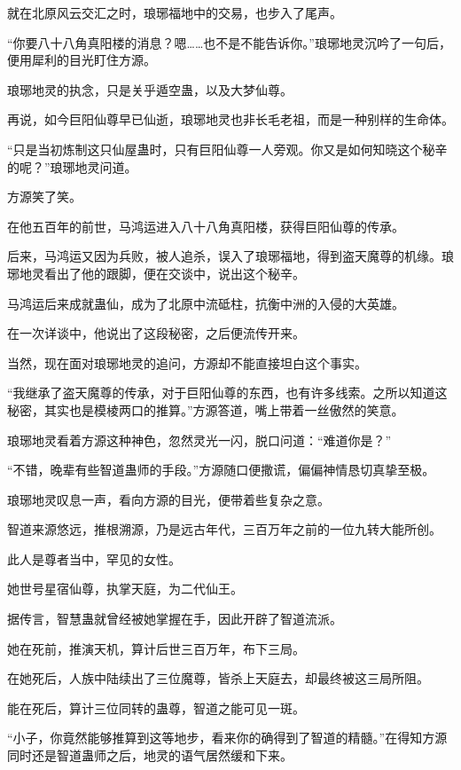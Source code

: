 
\begin{this_body}

就在北原风云交汇之时，琅琊福地中的交易，也步入了尾声。

“你要八十八角真阳楼的消息？嗯……也不是不能告诉你。”琅琊地灵沉吟了一句后，便用犀利的目光盯住方源。

琅琊地灵的执念，只是关乎遁空蛊，以及大梦仙尊。

再说，如今巨阳仙尊早已仙逝，琅琊地灵也非长毛老祖，而是一种别样的生命体。

“只是当初炼制这只仙屋蛊时，只有巨阳仙尊一人旁观。你又是如何知晓这个秘辛的呢？”琅琊地灵问道。

方源笑了笑。

在他五百年的前世，马鸿运进入八十八角真阳楼，获得巨阳仙尊的传承。

后来，马鸿运又因为兵败，被人追杀，误入了琅琊福地，得到盗天魔尊的机缘。琅琊地灵看出了他的跟脚，便在交谈中，说出这个秘辛。

马鸿运后来成就蛊仙，成为了北原中流砥柱，抗衡中洲的入侵的大英雄。

在一次详谈中，他说出了这段秘密，之后便流传开来。

当然，现在面对琅琊地灵的追问，方源却不能直接坦白这个事实。

“我继承了盗天魔尊的传承，对于巨阳仙尊的东西，也有许多线索。之所以知道这秘密，其实也是模棱两口的推算。”方源答道，嘴上带着一丝傲然的笑意。

琅琊地灵看着方源这种神色，忽然灵光一闪，脱口问道：“难道你是？”

“不错，晚辈有些智道蛊师的手段。”方源随口便撒谎，偏偏神情恳切真挚至极。

琅琊地灵叹息一声，看向方源的目光，便带着些复杂之意。

智道来源悠远，推根溯源，乃是远古年代，三百万年之前的一位九转大能所创。

此人是尊者当中，罕见的女性。

她世号星宿仙尊，执掌天庭，为二代仙王。

据传言，智慧蛊就曾经被她掌握在手，因此开辟了智道流派。

她在死前，推演天机，算计后世三百万年，布下三局。

在她死后，人族中陆续出了三位魔尊，皆杀上天庭去，却最终被这三局所阻。

能在死后，算计三位同转的蛊尊，智道之能可见一斑。

“小子，你竟然能够推算到这等地步，看来你的确得到了智道的精髓。”在得知方源同时还是智道蛊师之后，地灵的语气居然缓和下来。


\end{this_body}
